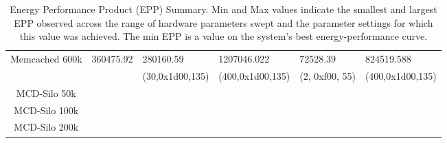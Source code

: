 \begin{table*}[htb]
\begin{tabular}{|c||l||l|l||l|l|}
Memcached 600k                                                                    &         360475.92                     &  280160.59        &   1207046.022      &  72528.39             &   824519.588   \\ 
                                                                                  &                                       & (30,0x1d00,135)    & (400,0x1d00,135)  &   (2, 0xf00, 55)  & (400,0x1d00,135)   \\ \hline \hline

MCD-Silo 50k                                                                       &                                    &                 &                &              &             \\ \hline
MCD-Silo 100k                                                                      &                                    &                 &                &              &             \\ \hline
MCD-Silo 200k                                                                      &                                    &                 &                &              &             \\ \hline  \hline
\end{tabular}
\caption{Energy Performance Product (EPP) Summary. Min and Max values indicate the smallest and largest EPP observed across the range of hardware parameters swept and the parameter settings for which this value was achieved.  The min EPP is a value on the system's best energy-performance curve.}
\label{table:eppsum}
\end{table*}